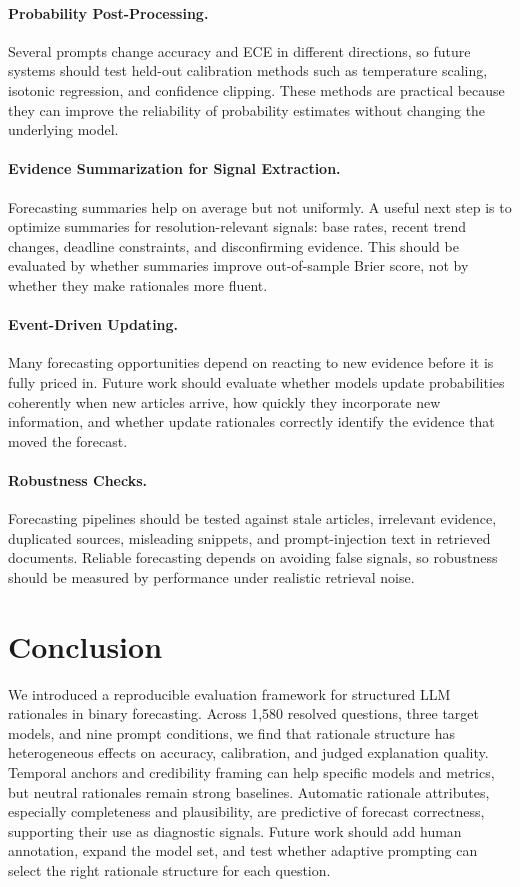 \documentclass[11pt]{article}
\begin{document}
\paragraph{Probability Post-Processing.}
Several prompts change accuracy and ECE in different directions, so future systems should test held-out calibration methods such as temperature scaling, isotonic regression, and confidence clipping.
These methods are practical because they can improve the reliability of probability estimates without changing the underlying model.

\paragraph{Evidence Summarization for Signal Extraction.}
Forecasting summaries help on average but not uniformly.
A useful next step is to optimize summaries for resolution-relevant signals: base rates, recent trend changes, deadline constraints, and disconfirming evidence.
This should be evaluated by whether summaries improve out-of-sample Brier score, not by whether they make rationales more fluent.

\paragraph{Event-Driven Updating.}
Many forecasting opportunities depend on reacting to new evidence before it is fully priced in.
Future work should evaluate whether models update probabilities coherently when new articles arrive, how quickly they incorporate new information, and whether update rationales correctly identify the evidence that moved the forecast.

\paragraph{Robustness Checks.}
Forecasting pipelines should be tested against stale articles, irrelevant evidence, duplicated sources, misleading snippets, and prompt-injection text in retrieved documents.
Reliable forecasting depends on avoiding false signals, so robustness should be measured by performance under realistic retrieval noise.

\section{Conclusion}

We introduced a reproducible evaluation framework for structured LLM rationales in binary forecasting.
Across 1,580 resolved questions, three target models, and nine prompt conditions, we find that rationale structure has heterogeneous effects on accuracy, calibration, and judged explanation quality.
Temporal anchors and credibility framing can help specific models and metrics, but neutral rationales remain strong baselines.
Automatic rationale attributes, especially completeness and plausibility, are predictive of forecast correctness, supporting their use as diagnostic signals.
Future work should add human annotation, expand the model set, and test whether adaptive prompting can select the right rationale structure for each question.
\end{document}
